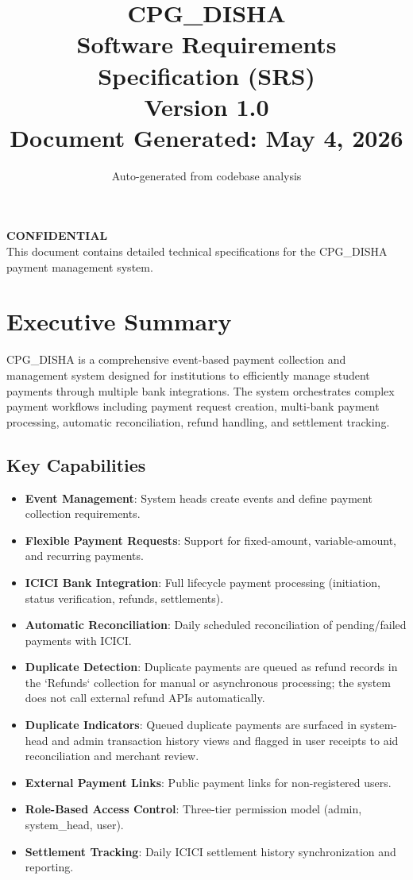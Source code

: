 \documentclass[12pt,a4paper]{article}
\title{
  \textbf{CPG\_DISHA} \\[1ex]
  \large Software Requirements Specification (SRS) \\[0.5ex]
  \normalsize Version 1.0 \\[1ex]
  Document Generated: May 4, 2026
}
\author{Auto-generated from codebase analysis}
\date{}
\begin{document}
\maketitle
\thispagestyle{empty}
\vfill
\begin{center}
  \textbf{CONFIDENTIAL} \\[2ex]
  This document contains detailed technical specifications for the CPG\_DISHA payment management system.
\end{center}
\newpage

\tableofcontents
\newpage

\section{Executive Summary}
CPG\_DISHA is a comprehensive event-based payment collection and management system designed for institutions to efficiently manage student payments through multiple bank integrations. The system orchestrates complex payment workflows including payment request creation, multi-bank payment processing, automatic reconciliation, refund handling, and settlement tracking.

\subsection{Key Capabilities}
\begin{itemize}
  \item \textbf{Event Management}: System heads create events and define payment collection requirements.
  \item \textbf{Flexible Payment Requests}: Support for fixed-amount, variable-amount, and recurring payments.
  \item \textbf{ICICI Bank Integration}: Full lifecycle payment processing (initiation, status verification, refunds, settlements).
  \item \textbf{Automatic Reconciliation}: Daily scheduled reconciliation of pending/failed payments with ICICI.
  \item \textbf{Duplicate Detection}: Duplicate payments are queued as refund records in the `Refunds` collection for manual or asynchronous processing; the system does not call external refund APIs automatically.\
  \item \textbf{Duplicate Indicators}: Queued duplicate payments are surfaced in system-head and admin transaction history views and flagged in user receipts to aid reconciliation and merchant review.
  \item \textbf{External Payment Links}: Public payment links for non-registered users.
  \item \textbf{Role-Based Access Control}: Three-tier permission model (admin, system\_head, user).
  \item \textbf{Settlement Tracking}: Daily ICICI settlement history synchronization and reporting.
\end{itemize}
\end{document}

